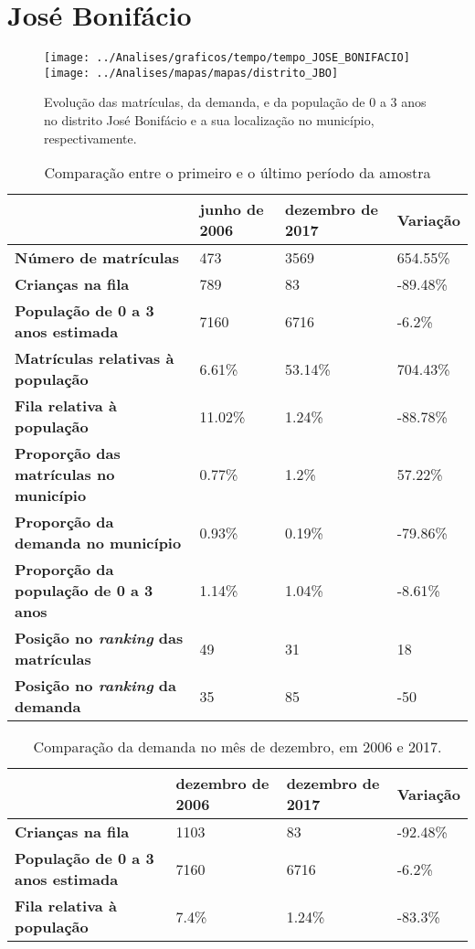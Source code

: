 \section{José Bonifácio}
\begin{figure}[H]
	\centering
	\texttt{[image: ../Analises/graficos/tempo/tempo\_JOSE\_BONIFACIO]}
	\texttt{[image: ../Analises/mapas/mapas/distrito\_JBO]}
	\caption{Evolução das matrículas, da demanda, e da população de 0 a 3 anos no distrito José Bonifácio e a sua localização no município, respectivamente.}
\end{figure}
\begin{table}[H]
	\begin{tabular}{|l|l|l|l|}
		\hline
		\textbf{}                                      & \textbf{junho de 2006}       & \textbf{dezembro de 2017}    & \textbf{Variação} \\ \hline
		\textbf{Número de matrículas}                  & 473 & 3569 & 654.55\% \\ \hline
		\textbf{Crianças na fila}                      & 789 & 83 & -89.48\% \\ \hline
		\textbf{População de 0 a 3 anos estimada}      & 7160 & 6716 & -6.2\% \\ \hline
		\textbf{Matrículas relativas à população}      & 6.61\% & 53.14\% & 704.43\% \\ \hline
		\textbf{Fila relativa à população}             & 11.02\% & 1.24\% & -88.78\% \\ \hline
		\textbf{Proporção das matrículas no município} & 0.77\% & 1.2\% & 57.22\% \\ \hline
		\textbf{Proporção da demanda no município}     & 0.93\% & 0.19\% & -79.86\% \\ \hline
		\textbf{Proporção da população de 0 a 3 anos}  & 1.14\% & 1.04\% & -8.61\% \\ \hline
		\textbf{Posição no \textit{ranking} das matrículas}     & 49 & 31 & 18 \\ \hline
		\textbf{Posição no \textit{ranking} da demanda}         & 35 & 85 & -50 \\ \hline
	\end{tabular}
	\caption{Comparação entre o primeiro e o último período da amostra}
\end{table}
\begin{table}[H]
	\begin{tabular}{|l|l|l|l|}
		\hline
		\textbf{}                                 & \textbf{dezembro de 2006} & \textbf{dezembro de 2017} & \textbf{Variação} \\ \hline
		\textbf{Crianças na fila}                      & 1103 & 83 & -92.48\% \\ \hline
		\textbf{População de 0 a 3 anos estimada}      & 7160 & 6716 & -6.2\% \\ \hline
		\textbf{Fila relativa à população}             & 7.4\% & 1.24\% & -83.3\% \\ \hline
	\end{tabular}
	\caption{Comparação da demanda no mês de dezembro, em 2006 e 2017.}
\end{table}
